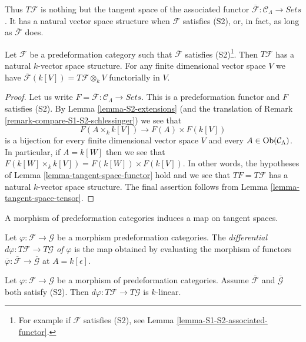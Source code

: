 \noindent
Thus $T \mathcal{F}$ is nothing but the tangent space of the associated
functor $\overline{\mathcal{F}}: \mathcal{C}_\Lambda \to \textit{Sets}$.
It has a natural vector space structure when $\mathcal{F}$ satisfies (S2),
or, in fact, as long as $\overline{\mathcal{F}}$ does.

\begin{lemma}
\label{lemma-tangent-space-vector-space}
Let $\mathcal{F}$ be a predeformation category such that
$\overline{\mathcal{F}}$ satisfies (S2)\footnote{For example
if $\mathcal{F}$ satisfies (S2), see
Lemma \ref{lemma-S1-S2-associated-functor}.}. Then $T \mathcal{F}$ has a
natural $k$-vector space structure. For any finite dimensional
vector space $V$ we have
$\overline{\mathcal{F}}(k[V]) = T\mathcal{F} \otimes_k V$
functorially in $V$.
\end{lemma}

\begin{proof}
Let us write
$F = \overline{\mathcal{F}} : \mathcal{C}_\Lambda \to \textit{Sets}$.
This is a predeformation functor and $F$ satisfies (S2). By
Lemma \ref{lemma-S2-extensions}
(and the translation of
Remark \ref{remark-compare-S1-S2-schlessinger})
we see that
$$
F(A \times_k k[V]) \longrightarrow F(A) \times F(k[V])
$$
is a bijection for every finite dimensional vector space $V$ and every
$A \in \mathop{\mathrm{Ob}}\nolimits(\mathcal{C}_\Lambda)$. In particular, if $A = k[W]$
then we see that $F(k[W] \times_k k[V]) = F(k[W]) \times F(k[V])$.
In other words, the hypotheses of
Lemma \ref{lemma-tangent-space-functor}
hold and we see that $TF = T \mathcal{F}$
has a natural $k$-vector space structure.
The final assertion follows from
Lemma \ref{lemma-tangent-space-tensor}.
\end{proof}

\noindent
A morphism of predeformation categories induces a map on tangent spaces.

\begin{definition}
\label{definition-differential}
Let $\varphi : \mathcal{F} \to \mathcal{G}$ be a morphism predeformation
categories. The
{\it differential $d \varphi : T \mathcal{F} \to T \mathcal{G}$ of $\varphi$}
is the map obtained by evaluating the morphism of functors
$\overline{\varphi}: \overline{\mathcal{F}} \to \overline{\mathcal{G}}$
at $A = k[\epsilon]$.
\end{definition}

\begin{lemma}
\label{lemma-k-linear-differential}
Let $\varphi : \mathcal{F} \to \mathcal{G}$ be a morphism of predeformation
categories. Assume $\overline{\mathcal{F}}$ and $\overline{\mathcal{G}}$ both
satisfy (S2). Then $d \varphi : T \mathcal{F} \to T \mathcal{G}$ is $k$-linear.
\end{lemma}

